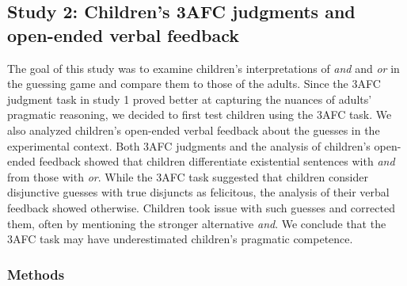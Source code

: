 \documentclass[floatsintext,man]{apa6}
\theoremstyle{definition}
\theoremstyle{definition}
\theoremstyle{definition}
\theoremstyle{remark}
\begin{document}
\subsection{Study 2: Children's 3AFC judgments and open-ended verbal
feedback}\label{study-2-childrens-3afc-judgments-and-open-ended-verbal-feedback}

The goal of this study was to examine children's interpretations of
\emph{and} and \emph{or} in the guessing game and compare them to those
of the adults. Since the 3AFC judgment task in study 1 proved better at
capturing the nuances of adults' pragmatic reasoning, we decided to
first test children using the 3AFC task. We also analyzed children's
open-ended verbal feedback about the guesses in the experimental
context. Both 3AFC judgments and the analysis of children's open-ended
feedback showed that children differentiate existential sentences with
\emph{and} from those with \emph{or}. While the 3AFC task suggested that
children consider disjunctive guesses with true disjuncts as felicitous,
the analysis of their verbal feedback showed otherwise. Children took
issue with such guesses and corrected them, often by mentioning the
stronger alternative \emph{and}. We conclude that the 3AFC task may have
underestimated children's pragmatic competence.

\subsubsection{Methods}\label{methods-1}
\end{document}
